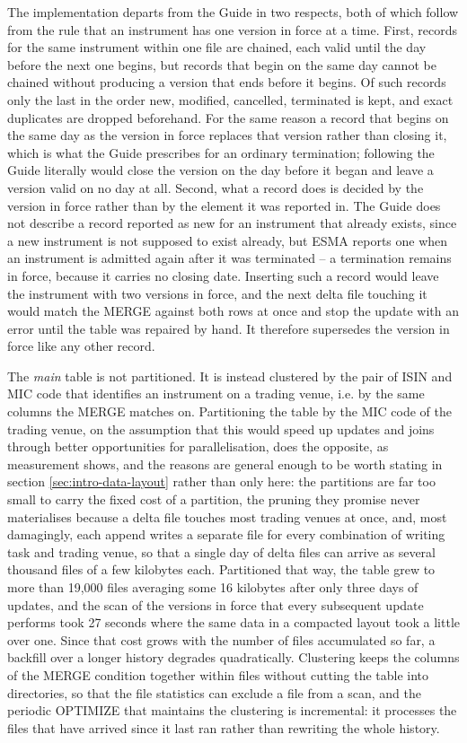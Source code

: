 The implementation departs from the Guide in two respects, both of which follow from the rule that an instrument has one version in force at a time. First, records for the same instrument within one file are chained, each valid until the day before the next one begins, but records that begin on the same day cannot be chained without producing a version that ends before it begins. Of such records only the last in the order new, modified, cancelled, terminated is kept, and exact duplicates are dropped beforehand. For the same reason a record that begins on the same day as the version in force replaces that version rather than closing it, which is what the Guide prescribes for an ordinary termination; following the Guide literally would close the version on the day before it began and leave a version valid on no day at all. Second, what a record does is decided by the version in force rather than by the element it was reported in. The Guide does not describe a record reported as new for an instrument that already exists, since a new instrument is not supposed to exist already, but ESMA reports one when an instrument is admitted again after it was terminated -- a termination remains in force, because it carries no closing date. Inserting such a record would leave the instrument with two versions in force, and the next delta file touching it would match the MERGE against both rows at once and stop the update with an error until the table was repaired by hand. It therefore supersedes the version in force like any other record.

The \emph{main} table is not partitioned. It is instead clustered by the pair of ISIN and MIC code that identifies an instrument on a trading venue, i.e. by the same columns the MERGE matches on. Partitioning the table by the MIC code of the trading venue, on the assumption that this would speed up updates and joins through better opportunities for parallelisation, does the opposite, as measurement shows, and the reasons are general enough to be worth stating in section \ref{sec:intro-data-layout} rather than only here: the partitions are far too small to carry the fixed cost of a partition, the pruning they promise never materialises because a delta file touches most trading venues at once, and, most damagingly, each append writes a separate file for every combination of writing task and trading venue, so that a single day of delta files can arrive as several thousand files of a few kilobytes each. Partitioned that way, the table grew to more than 19,000 files averaging some 16 kilobytes after only three days of updates, and the scan of the versions in force that every subsequent update performs took 27 seconds where the same data in a compacted layout took a little over one. Since that cost grows with the number of files accumulated so far, a backfill over a longer history degrades quadratically. Clustering keeps the columns of the MERGE condition together within files without cutting the table into directories, so that the file statistics can exclude a file from a scan, and the periodic OPTIMIZE that maintains the clustering is incremental: it processes the files that have arrived since it last ran rather than rewriting the whole history.

